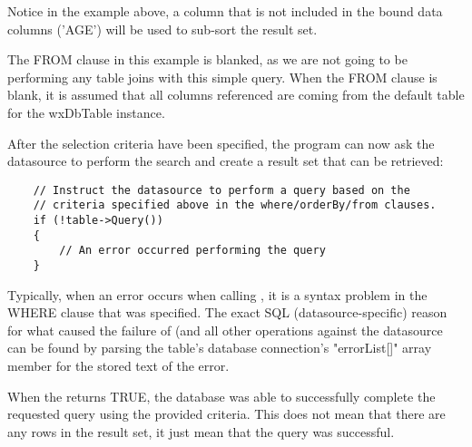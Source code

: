 Notice in the example above, a column that is not included in the bound 
data columns ('AGE') will be used to sub-sort the result set. 

The FROM clause in this example is blanked, as we are not going to be 
performing any table joins with this simple query. When the FROM clause 
is blank, it is assumed that all columns referenced are coming from 
the default table for the wxDbTable instance.

After the selection criteria have been specified, the program can now 
ask the datasource to perform the search and create a result set that 
can be retrieved:

\begin{verbatim}
    // Instruct the datasource to perform a query based on the 
    // criteria specified above in the where/orderBy/from clauses.
    if (!table->Query())
    {
        // An error occurred performing the query
    }
\end{verbatim}

Typically, when an error occurs when calling , it is a 
syntax problem in the WHERE clause that was specified. The exact SQL 
(datasource-specific) reason for what caused the failure of  
(and all other operations against the datasource can be found by 
parsing the table's database connection's "errorList[]" array member for 
the stored text of the error.

When the  returns TRUE, the 
database was able to successfully complete the requested query using the 
provided criteria. This does not mean that there are any rows in the 
result set, it just mean that the query was successful.


